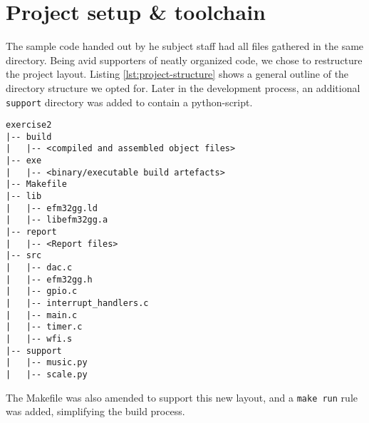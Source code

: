 \section{Project setup \& toolchain}

The sample code handed out by he subject staff had all files gathered in the same directory. Being avid supporters of neatly organized code, we chose to restructure the project layout. Listing \ref{lst:project-structure} shows a general outline of the directory structure we opted for. Later in the development process, an additional \texttt{support} directory was added to contain a python-script.

\begin{lstlisting}[label=lst:project-structure, caption=Revised project structure]
exercise2
|-- build
|   |-- <compiled and assembled object files>
|-- exe
|   |-- <binary/executable build artefacts>
|-- Makefile
|-- lib
|   |-- efm32gg.ld
|   |-- libefm32gg.a
|-- report
|   |-- <Report files>
|-- src
|   |-- dac.c
|   |-- efm32gg.h
|   |-- gpio.c
|   |-- interrupt_handlers.c
|   |-- main.c
|   |-- timer.c
|   |-- wfi.s
|-- support
|   |-- music.py
|   |-- scale.py
\end{lstlisting}

The Makefile was also amended to support this new layout, and a \texttt{make run} rule was added, simplifying the build process.


